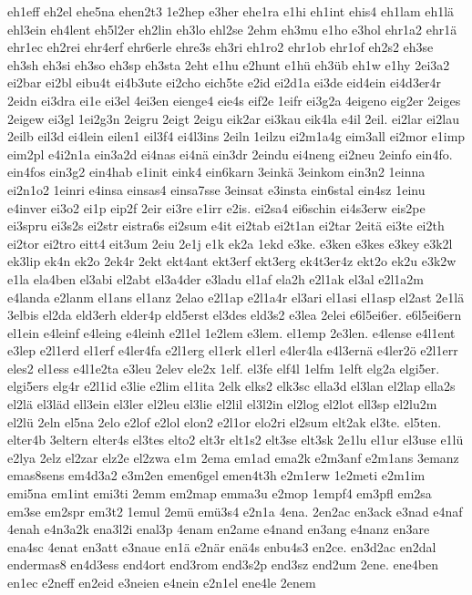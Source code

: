 {eh1eff
eh2el
ehe5na
ehen2t3
1e2hep
e3her
ehe1ra
e1hi
eh1int
ehis4
eh1lam
eh1lä
ehl3ein
eh4lent
eh5l2er
eh2lin
eh3lo
ehl2se
2ehm
eh3mu
e1ho
e3hol
ehr1a2
ehr1ä
ehr1ec
eh2rei
ehr4erf
ehr6erle
ehre3s
eh3ri
eh1ro2
ehr1ob
ehr1of
eh2s2
eh3se
eh3sh
eh3si
eh3so
eh3sp
eh3sta
2eht
e1hu
e2hunt
e1hü
eh3üb
eh1w
e1hy
2ei3a2
ei2bar
ei2bl
eibu4t
ei4b3ute
ei2cho
eich5te
e2id
ei2d1a
ei3de
eid4ein
ei4d3er4r
2eidn
ei3dra
ei1e
ei3el
4ei3en
eienge4
eie4s
eif2e
1eifr
ei3g2a
4eigeno
eig2er
2eiges
2eigew
ei3gl
1ei2g3n
2eigru
2eigt
2eigu
eik2ar
ei3kau
eik4la
e4il
2eil.
ei2lar
ei2lau
2eilb
eil3d
ei4lein
eilen1
eil3f4
ei4l3ins
2eiln
1eilzu
ei2m1a4g
eim3all
ei2mor
e1imp
eim2pl
e4i2n1a
ein3a2d
ei4nas
ei4nä
ein3dr
2eindu
ei4neng
ei2neu
2einfo
ein4fo.
ein4fos
ein3g2
ein4hab
e1init
eink4
ein6karn
3einkä
3einkom
ein3n2
1einna
ei2n1o2
1einri
e4insa
einsas4
einsa7sse
3einsat
e3insta
ein6stal
ein4sz
1einu
e4inver
ei3o2
ei1p
eip2f
2eir
ei3re
e1irr
e2is.
ei2sa4
ei6schin
ei4s3erw
eis2pe
ei3spru
ei3s2s
ei2str
eistra6s
ei2sum
e4it
ei2tab
ei2t1an
ei2tar
2eitä
ei3te
ei2th
ei2tor
ei2tro
eitt4
eit3um
2eiu
2e1j
e1k
ek2a
1ekd
e3ke.
e3ken
e3kes
e3key
e3k2l
ek3lip
ek4n
ek2o
2ek4r
2ekt
ekt4ant
ekt3erf
ekt3erg
ek4t3er4z
ekt2o
ek2u
e3k2w
e1la
ela4ben
el3abi
el2abt
el3a4der
e3ladu
el1af
ela2h
e2l1ak
el3al
e2l1a2m
e4landa
e2lanm
el1ans
el1anz
2elao
e2l1ap
e2l1a4r
el3ari
el1asi
el1asp
el2ast
2e1lä
3elbis
el2da
eld3erh
elder4p
eld5erst
el3des
eld3s2
e3lea
2elei
e6l5ei6er.
e6l5ei6ern
el1ein
e4leinf
e4leing
e4leinh
e2l1el
1e2lem
e3lem.
el1emp
2e3len.
e4lense
e4l1ent
e3lep
e2l1erd
el1erf
e4ler4fa
e2l1erg
el1erk
el1erl
e4ler4la
e4l3ernä
e4ler2ö
e2l1err
eles2
el1ess
e4l1e2ta
e3leu
2elev
ele2x
1elf.
el3fe
elf4l
1elfm
1elft
elg2a
elgi5er.
elgi5ers
elg4r
e2l1id
e3lie
e2lim
el1ita
2elk
elks2
elk3sc
ella3d
el3lan
el2lap
ella2s
el2lä
el3läd
ell3ein
el3ler
el2leu
el3lie
el2lil
el3l2in
el2log
el2lot
ell3sp
el2lu2m
el2lü
2eln
el5na
2elo
e2lof
e2lol
elon2
e2l1or
elo2ri
el2sum
elt2ak
el3te.
el5ten.
elter4b
3eltern
elter4s
el3tes
elto2
elt3r
elt1s2
elt3se
elt3sk
2e1lu
el1ur
el3use
e1lü
e2lya
2elz
el2zar
elz2e
el2zwa
e1m
2ema
em1ad
ema2k
e2m3anf
e2m1ans
3emanz
emas8sens
em4d3a2
e3m2en
emen6gel
emen4t3h
e2m1erw
1e2meti
e2m1im
emi5na
em1int
emi3ti
2emm
em2map
emma3u
e2mop
1empf4
em3pfl
em2sa
em3se
em2spr
em3t2
1emul
2emü
emü3s4
e2n1a
4ena.
2en2ac
en3ack
e3nad
e4naf
4enah
e4n3a2k
ena3l2i
enal3p
4enam
en2ame
e4nand
en3ang
e4nanz
en3are
ena4sc
4enat
en3att
e3naue
en1ä
e2när
enä4s
enbu4s3
en2ce.
en3d2ac
en2dal
endermas8
en4d3ess
end4ort
end3rom
end3s2p
end3sz
end2um
2ene.
ene4ben
en1ec
e2neff
en2eid
e3neien
e4nein
e2n1el
ene4le
2enem
}
